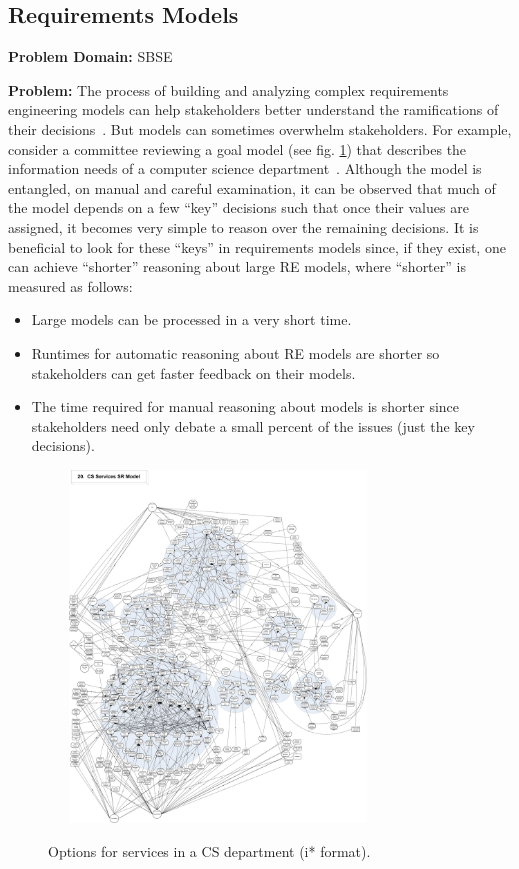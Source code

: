 \documentclass[sigconf,anonymous,review]{acmart}
\begin{document}
    \subsection{Requirements Models}
    \textbf{Problem Domain: } SBSE
    
    \noindent\textbf{Problem:} The process of building and analyzing complex requirements engineering models can help stakeholders better understand the ramifications of their decisions~\cite{Lamsweerde2001,amyot10}. But models can sometimes overwhelm stakeholders. For example, consider a committee reviewing a goal model (see fig. \ref{fig:csServices}) that describes the information needs of a computer science department~\cite{Horkoff2016}. Although the model is entangled, on manual and careful examination, it can be  observed that much of the model depends on a few ``key'' decisions such that once their values are assigned, it becomes very simple to reason over the remaining decisions. It is beneficial to look for these ``keys'' in requirements models since, if they exist, one can achieve ``shorter'' reasoning about large RE models, where ``shorter'' is measured as follows:
    \begin{itemize}
     \item{Large models can be processed in a very short time.}
     \item{Runtimes for automatic reasoning about RE models are shorter so stakeholders can get faster feedback on their models.}
     \item{The time required for manual reasoning about models is shorter since stakeholders need only debate a small percent of the issues (just the key decisions).}
    \end{itemize}
   
    
    \begin{figure}[!t] 
  ~~~\includegraphics[width=3.1in]{img/CSServices.pdf} 
    \caption{Options for services in a CS department (i* format).}
    \label{fig:csServices}
\end{figure}
\end{document}
